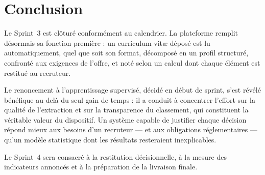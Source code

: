 \documentclass[11pt,a4paper]{article}
\begin{document}
\section{Conclusion}
Le Sprint~3 est clôturé conformément au calendrier. La plateforme remplit désormais sa fonction première : un curriculum vitæ déposé est lu automatiquement, quel que soit son format, décomposé en un profil structuré, confronté aux exigences de l'offre, et noté selon un calcul dont chaque élément est restitué au recruteur.

Le renoncement à l'apprentissage supervisé, décidé en début de sprint, s'est révélé bénéfique au-delà du seul gain de temps : il a conduit à concentrer l'effort sur la qualité de l'extraction et sur la transparence du classement, qui constituent la véritable valeur du dispositif. Un système capable de justifier chaque décision répond mieux aux besoins d'un recruteur — et aux obligations réglementaires — qu'un modèle statistique dont les résultats resteraient inexplicables.

Le Sprint~4 sera consacré à la restitution décisionnelle, à la mesure des indicateurs annoncés et à la préparation de la livraison finale.
\end{document}
